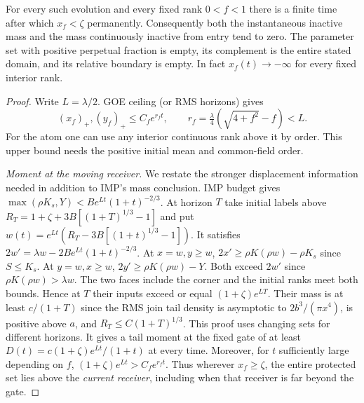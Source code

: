 \documentclass[11pt]{article}
\begin{document}
\begin{theorem}\label{an04ffpv1:return}
For every such evolution and every fixed rank $0<f<1$ there is a
finite time after which $x_f<\zeta$ permanently. Consequently both
the instantaneous inactive mass and the mass continuously inactive
from entry tend to zero. The parameter set with positive perpetual
fraction is empty, its complement is the entire stated domain,
and its relative boundary is empty. In fact $x_f(t)\to-\infty$ for every fixed interior rank.
\end{theorem}
\begin{proof}
Write $L=\lambda/2$. GOE ceiling (or RMS horizons) gives
\[
 (x_f)_+,(y_f)_+\le C_f e^{r_f t},\qquad
 r_f=\tfrac\lambda4(\sqrt{4+f^2}-f)<L.
\]
For the atom one can use any interior continuous rank above it by order.
This upper bound needs the positive initial mean and common-field order.

\emph{Moment at the moving receiver.} We restate the stronger
displacement information needed in addition to IMP's mass conclusion.
IMP budget gives $\max(\rho K_s,Y)<B e^{Lt}(1+t)^{-2/3}$.
At horizon $T$ take initial labels above
$R_T=1+\zeta+3B[(1+T)^{1/3}-1]$ and put
$w(t)=e^{Lt}(R_T-3B[(1+t)^{1/3}-1])$.
It satisfies $2w'=\lambda w-2B e^{Lt}(1+t)^{-2/3}$.
At $x=w,y\ge w$, $2x'\ge\rho K(\rho w)-\rho K_s$ since
$S\le K_s$. At $y=w,x\ge w$, $2y'\ge\rho K(\rho w)-Y$.
Both exceed $2w'$ since $\rho K(\rho w)>\lambda w$.
The two faces include the corner and the initial ranks meet both bounds.
Hence at $T$ their inputs exceed or equal $(1+\zeta)e^{LT}$.
Their mass is at least $c/(1+T)$ since the RMS join tail density
is asymptotic to $2b^3/(\pi x^4)$, is positive above $a$,
and $R_T\le C(1+T)^{1/3}$. This proof uses changing sets for
different horizons. It gives a tail moment at the fixed gate of at
least $D(t)=c(1+\zeta)e^{Lt}/(1+t)$ at every time.
Moreover, for $t$ sufficiently large depending on $f$,
$(1+\zeta)e^{Lt}>C_fe^{r_f t}$. Thus wherever $x_f\ge\zeta$,
the entire protected set lies above the \emph{current receiver},
including when that receiver is far beyond the gate.


\end{proof}
\end{document}
